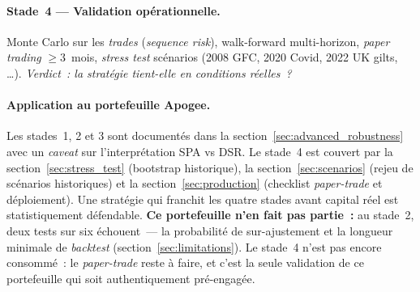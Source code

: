 \paragraph{Stade~4 --- Validation opérationnelle.} Monte Carlo sur les \emph{trades} (\emph{sequence risk}), walk-forward multi-horizon, \emph{paper trading} $\geq 3$~mois, \emph{stress test} scénarios (2008 GFC, 2020 Covid, 2022 UK gilts, \ldots). \textit{Verdict~: la stratégie tient-elle en conditions réelles~?}

\paragraph{Application au portefeuille Apogee.} Les stades~1, 2 et 3 sont documentés dans la section~\ref{sec:advanced_robustness} avec un \emph{caveat} sur l'interprétation SPA vs DSR. Le stade~4 est couvert par la section~\ref{sec:stress_test} (bootstrap historique), la section~\ref{sec:scenarios} (rejeu de scénarios historiques) et la section~\ref{sec:production} (checklist \emph{paper-trade} et déploiement). Une stratégie qui franchit les quatre stades avant capital réel est statistiquement défendable. \textbf{Ce portefeuille n'en fait pas partie~:} au stade~2, deux tests sur six échouent~--- la probabilité de sur-ajustement et la longueur minimale de \emph{backtest} (section~\ref{sec:limitations}). Le stade~4 n'est pas encore consommé~: le \emph{paper-trade} reste à faire, et c'est la seule validation de ce portefeuille qui soit authentiquement pré-engagée.
